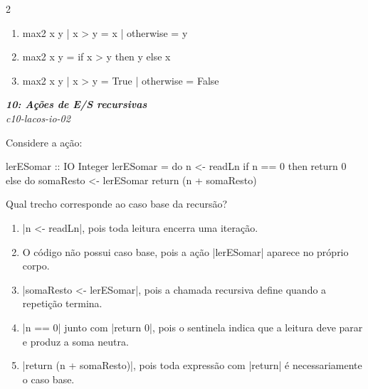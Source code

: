 \documentclass[a4paper,10pt,brazil]{article}
\begin{document}
\begin{multicols}{2}
\begin{enumerate}
  \item \begin{haskellcode}
max2 x y
  | x > y     = x
  | otherwise = y
\end{haskellcode}

  \item \begin{haskellcode}
max2 x y = if x > y then y else x
\end{haskellcode}

  \item \begin{haskellcode}
max2 x y
  | x > y     = True
  | otherwise = False
\end{haskellcode}


\end{enumerate}

\begin{flushright}
  \footnotesize
  \textit{\textbf{10: Ações de E/S recursivas}}\\
  \textit{c10-lacos-io-02}\\

\end{flushright}
Considere a ação:

\begin{haskellcode}
lerESomar :: IO Integer
lerESomar = do
  n <- readLn
  if n == 0
    then return 0
    else do
      somaResto <- lerESomar
      return (n + somaResto)
\end{haskellcode}

Qual trecho corresponde ao caso base da recursão?

\begin{enumerate}
  \item \haskellinline|n <- readLn|, pois toda leitura encerra uma iteração.

  \item O código não possui caso base, pois a ação \haskellinline|lerESomar| aparece no próprio corpo.

  \item \haskellinline|somaResto <- lerESomar|, pois a chamada recursiva define quando a repetição termina.

  \item \haskellinline|n == 0| junto com \haskellinline|return 0|, pois o sentinela indica que a leitura deve parar e produz a soma neutra.

  \item \haskellinline|return (n + somaResto)|, pois toda expressão com \haskellinline|return| é necessariamente o caso base.



\end{enumerate}
\end{multicols}
\end{document}
